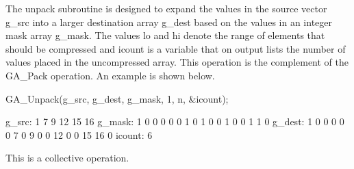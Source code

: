 \documentclass[12pt]{article}
\begin{document}
\begin{desc}

The unpack subroutine is designed to expand the values in the source vector g_src into a larger destination array g_dest based on the values in an integer mask array g_mask. The values lo and hi denote the range of elements that should be compressed and icount is a variable that on output lists the number of values placed in the uncompressed array. This operation is the complement of the GA_Pack operation. An example is shown below.

\begin{codeseg}
 GA_Unpack(g_src, g_dest, g_mask, 1, n, \&icount);

g_src:    1  7  9 12 15 16
g_mask:   1  0  0  0  0  0  1  0  1  0  0  1  0  0  1  1  0
g_dest:   1  0  0  0  0  0  7  0  9  0  0 12  0  0 15 16  0
icount:   6
\end{codeseg}

This is a collective operation.

\end{desc}
\end{document}
